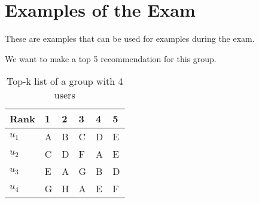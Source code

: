 \newpage
\section*{Examples of the Exam}
These are examples that can be used for examples during the exam.

We want to make a top 5 recommendation for this group.
\begin{table}[h]
\begin{tabular}{|l|lllll|} \hline
Rank  & 1 & 2 & 3 & 4 & 5 \\\hline
$u_1$ & A & B & C & D & E \\
$u_2$ & C & D & F & A & E \\
$u_3$ & E & A & G & B & D \\
$u_4$ & G & H & A & E & F\\\hline
\end{tabular}
\caption{Top-k list of a group with 4 users}
\end{table}







